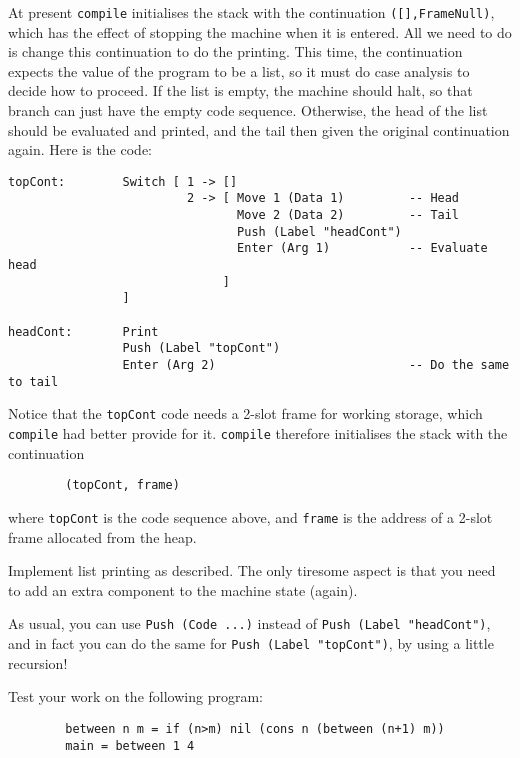 At present \mbox{\tt compile} initialises the stack with the continuation
\mbox{\tt ([],FrameNull)},
which has the effect of stopping the machine when it is entered.
All we need to do is change this continuation to do the printing.
This time, the continuation expects the value of the program to be a list,
so it must do case analysis to decide how to proceed.  If the list is empty,
the machine should halt, so that branch can just have the empty code sequence.
Otherwise, the head of the list should be evaluated and printed, and the
tail then given the original continuation again.  Here is the code:
\begin{verbatim}
topCont:        Switch [ 1 -> []
                         2 -> [ Move 1 (Data 1)         -- Head
                                Move 2 (Data 2)         -- Tail
                                Push (Label "headCont")
                                Enter (Arg 1)           -- Evaluate head
                              ]
                ]

headCont:       Print
                Push (Label "topCont")
                Enter (Arg 2)                           -- Do the same to tail
\end{verbatim}
Notice that the \mbox{\tt topCont} code needs a 2-slot frame for working storage,
which \mbox{\tt compile} had better provide for it.  \mbox{\tt compile} therefore initialises
the stack with the continuation
\begin{verbatim}
        (topCont, frame)
\end{verbatim}
where \mbox{\tt topCont} is the code sequence above, and \mbox{\tt frame} is the address of
a 2-slot frame allocated from the heap.

\begin{exercise}
Implement list printing as described.  The only tiresome aspect is that
you need to add an extra component to the machine state (again).

As usual, you can use \mbox{\tt Push\ (Code\ ...)} instead of \mbox{\tt Push\ (Label\ "headCont")},
and in fact you can do the same for \mbox{\tt Push\ (Label\ "topCont")}, by using a
little recursion!

Test your work on the following program:
\begin{verbatim}
        between n m = if (n>m) nil (cons n (between (n+1) m))
        main = between 1 4
\end{verbatim}
\end{exercise}

